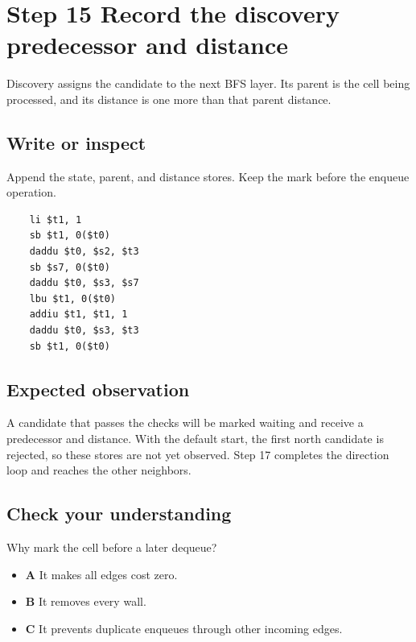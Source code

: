 \section{Step 15 Record the discovery predecessor and distance}\label{maze-s15}

Discovery assigns the candidate to the next BFS layer. Its parent is the cell being processed, and its distance is one more than that parent distance.

\subsection{Write or inspect}

Append the state, parent, and distance stores. Keep the mark before the enqueue operation.

\begin{verbatim}
    li $t1, 1
    sb $t1, 0($t0)
    daddu $t0, $s2, $t3
    sb $s7, 0($t0)
    daddu $t0, $s3, $s7
    lbu $t1, 0($t0)
    addiu $t1, $t1, 1
    daddu $t0, $s3, $t3
    sb $t1, 0($t0)
\end{verbatim}

\subsection{Expected observation}

A candidate that passes the checks will be marked waiting and receive a predecessor and distance. With the default start, the first north candidate is rejected, so these stores are not yet observed. Step 17 completes the direction loop and reaches the other neighbors.

\subsection{Check your understanding}

Why mark the cell before a later dequeue?

\begin{itemize}
  \item \textbf{A} It makes all edges cost zero.
  \item \textbf{B} It removes every wall.
  \item \textbf{C} It prevents duplicate enqueues through other incoming edges.
\end{itemize}

